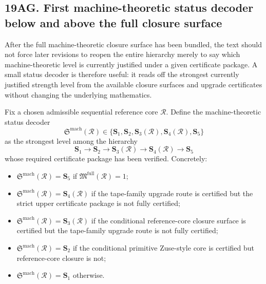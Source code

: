 \subsection*{19AG. First machine-theoretic status decoder below and above the full closure surface}
After the full machine-theoretic closure surface has been bundled, the text should not force later revisions to reopen the entire hierarchy merely to say which machine-theoretic level is currently justified under a given certificate package. A small status decoder is therefore useful: it reads off the strongest currently justified strength level from the available closure surfaces and upgrade certificates without changing the underlying mathematics.

\begin{definition}
Fix a chosen admissible sequential reference core \(\mathcal R\). Define the machine-theoretic status decoder
\[
\mathfrak S^{\mathrm{mach}}(\mathcal R)\in\{\mathbf S_1,\mathbf S_2,\mathbf S_3(\mathcal R),\mathbf S_4(\mathcal R),\mathbf S_5\}
\]
as the strongest level among the hierarchy
\[
\mathbf S_1\longrightarrow \mathbf S_2\longrightarrow \mathbf S_3(\mathcal R)\longrightarrow \mathbf S_4(\mathcal R)\longrightarrow \mathbf S_5
\]
whose required certificate package has been verified. Concretely:
\begin{itemize}[leftmargin=2em]
  \item \(\mathfrak S^{\mathrm{mach}}(\mathcal R)=\mathbf S_5\) if \(\mathfrak M^{\mathrm{full}}(\mathcal R)=1\);
  \item \(\mathfrak S^{\mathrm{mach}}(\mathcal R)=\mathbf S_4(\mathcal R)\) if the tape-family upgrade route is certified but the strict upper certificate package is not fully certified;
  \item \(\mathfrak S^{\mathrm{mach}}(\mathcal R)=\mathbf S_3(\mathcal R)\) if the conditional reference-core closure surface is certified but the tape-family upgrade route is not fully certified;
  \item \(\mathfrak S^{\mathrm{mach}}(\mathcal R)=\mathbf S_2\) if the conditional primitive Zuse-style core is certified but reference-core closure is not;
  \item \(\mathfrak S^{\mathrm{mach}}(\mathcal R)=\mathbf S_1\) otherwise.
\end{itemize}
\end{definition}

